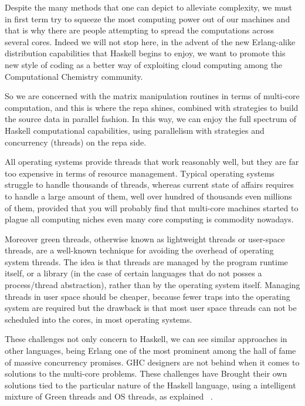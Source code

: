 \documentclass{tmr}
\begin{document}
Despite the many methods that one can depict to alleviate complexity,
 we must in first term try to squeeze the most computing power out of our machines
and that is why there are people attempting to spread the computations across several cores.
 Indeed we will not stop here, in the advent of the new Erlang-alike 
distribution capabilities that Haskell begins to enjoy, we want to promote this new style of
 coding as a better way of exploiting cloud computing among the 
Computational Chemistry community.

So we are concerned with the matrix manipulation routines in terms of multi-core computation,
and this is where the repa shines, combined with strategies to build the source data in parallel fashion. In this way,
we can enjoy the full spectrum of Haskell computational capabilities, using parallelism with strategies and
concurrency (threads) on the repa side.

All operating systems provide threads that work reasonably well, but they are far too expensive in terms 
of resource management. Typical operating systems struggle to handle thousands of threads, whereas current state of 
affairs requires to handle a large amount of them, well over hundred of thousands even millions of them, 
provided that you will probably find that multi-core machines started to plague all computing
niches even many core computing is commodity nowadays.

Moreover green threads, otherwise known as lightweight threads
or user-space threads, are a well-known technique for avoiding the overhead 
of operating system threads. The idea is that threads are managed by the 
program runtime itself, or a library (in the case of certain languages 
that do not posses a process/thread abstraction), rather than by the operating system itself. 
Managing threads in user space should be cheaper, because fewer traps into 
the operating system are required but the drawback is that most user space threads 
can not be scheduled into the cores, in most operating systems.

These challenges not only concern to Haskell, we can see similar approaches
in other languages, being Erlang one of the most prominent among the hall of 
fame of massive concurrency promises. GHC designers are not behind when it 
comes to solutions to the multi-core problems. These challenges have Brought their
own solutions tied to the particular nature of the Haskell language,
 using a intelligent mixture of Green threads and OS threads,
as explained ~\cite{Peyton}.
\end{document}
